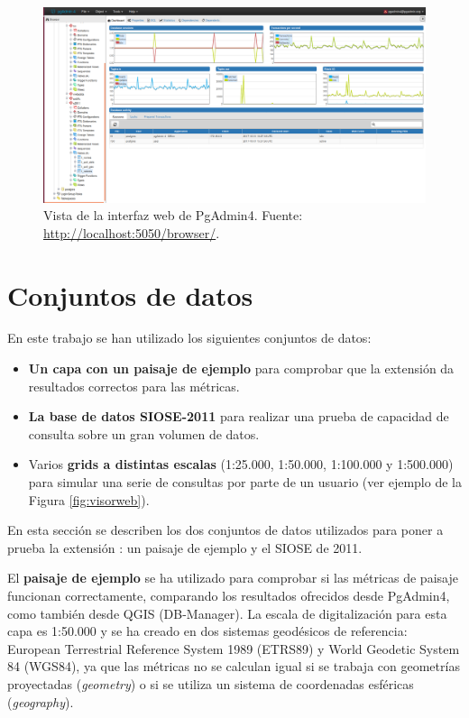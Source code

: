 \begin{figure}
\begin{center}
\includegraphics[width=\textwidth]{Metodologia/Figs/carga-siose-2011.png}
\caption{Vista de la interfaz web de PgAdmin4. Fuente: \url{http://localhost:5050/browser/}. \label{fig:carga}}
\end{center}
\end{figure}


\section{Conjuntos de datos\label{sec:datos}}

\begin{graybox}

En este trabajo se han utilizado los siguientes conjuntos de datos:

\begin{itemize}
\item \textbf{Un capa con un paisaje de ejemplo} para comprobar que la extensión \pgland{} da resultados correctos para las métricas.
\item \textbf{La base de datos SIOSE-2011} para realizar una prueba de capacidad de consulta sobre un gran volumen de datos.
\item Varios \textbf{grids a distintas escalas} (1:25.000, 1:50.000, 1:100.000 y 1:500.000) para simular una serie de consultas por parte de un usuario (ver ejemplo de la Figura \ref{fig:visorweb}).

\end{itemize}
\end{graybox}

En esta sección se describen los dos conjuntos de datos utilizados para poner a prueba la extensión \pgland{}: un paisaje de ejemplo y el SIOSE de 2011.

El \textbf{paisaje de ejemplo} se ha utilizado para comprobar si las métricas de paisaje funcionan correctamente, comparando los resultados ofrecidos desde PgAdmin4, como también desde QGIS (DB-Manager). La escala de digitalización para esta capa es 1:50.000 y se ha creado en dos sistemas geodésicos de referencia: European Terrestrial Reference System 1989 (ETRS89) y World Geodetic System 84 (WGS84), ya que las métricas no se calculan igual si se trabaja con geometrías proyectadas (\textit{geometry}) o si se utiliza un sistema de coordenadas esféricas (\textit{geography}). 

